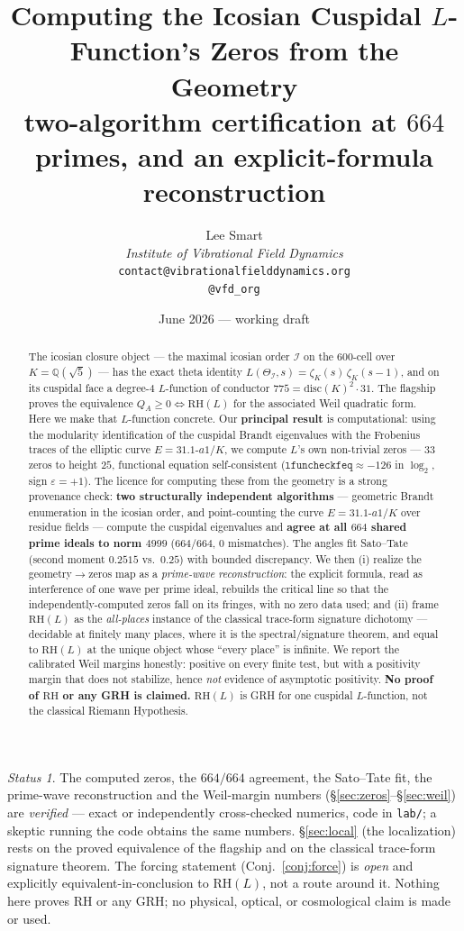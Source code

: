\documentclass[11pt]{article}
\title{Computing the Icosian Cuspidal $L$-Function's Zeros from the Geometry\\
\large two-algorithm certification at $664$ primes, and an explicit-formula reconstruction}
\author{%
  Lee Smart\\[4pt]
  \textit{Institute of Vibrational Field Dynamics}\\[2pt]
  \texttt{contact@vibrationalfielddynamics.org}\\[2pt]
  \texttt{@vfd\_org}%
}
\date{June 2026 --- working draft}
\theoremstyle{remark}
\newtheorem{status}[theorem]{Status}
\newcommand{\II}{\mathcal{I}}
\newcommand{\KK}{K}
\newcommand{\RH}{\mathrm{RH}}
\begin{document}
\maketitle

\begin{abstract}\noindent
The icosian closure object --- the maximal icosian order $\II$ on the $600$-cell over
$\KK=\mathbb{Q}(\sqrt5)$ --- has the exact theta identity
$L(\Theta_\II,s)=\zeta_\KK(s)\,\zeta_\KK(s-1)$, and on its cuspidal face a degree-$4$
$L$-function of conductor $775=\mathrm{disc}(\KK)^2\!\cdot31$. The flagship \cite{Flagship}
proves the equivalence $Q_A\ge0\iff\RH(L)$ for the associated Weil quadratic form. Here we
make that $L$-function concrete. Our \textbf{principal result} is computational: using the
modularity identification of the cuspidal Brandt eigenvalues with the Frobenius traces of
the elliptic curve $E=31.1\text{-}a1/\KK$, we compute $L$'s own non-trivial zeros --- $33$
zeros to height $25$, functional equation self-consistent ($\texttt{lfuncheckfeq}\approx-126$
in $\log_2$, sign $\varepsilon=+1$). The licence for computing these from the geometry is a
strong provenance check: \textbf{two structurally independent algorithms} --- geometric
Brandt enumeration in the icosian order, and point-counting the curve $E=31.1\text{-}a1/\KK$
over residue fields --- compute the cuspidal eigenvalues and \textbf{agree at all $664$
shared prime ideals to norm $4999$} ($664/664$, $0$ mismatches). The angles fit Sato--Tate
(second moment $0.2515$ vs.\ $0.25$) with bounded discrepancy. We then (i) realize the
geometry$\to$zeros map as a \emph{prime-wave reconstruction}: the explicit formula, read as
interference of one wave per prime ideal, rebuilds the critical line so that the
independently-computed zeros fall on its fringes, with no zero data used; and (ii) frame
$\RH(L)$ as the \emph{all-places} instance of the classical trace-form signature
dichotomy --- decidable at finitely many places, where it is the spectral/signature
theorem, and equal to $\RH(L)$ at the unique object whose ``every place'' is infinite. We
report the calibrated Weil margins honestly: positive on every finite test, but with a
positivity margin that does not stabilize, hence \emph{not} evidence of asymptotic
positivity. \textbf{No proof of $\RH$ or any GRH is claimed.} $\RH(L)$ is GRH for one
cuspidal $L$-function, not the classical Riemann Hypothesis.
\end{abstract}

\begin{status}
The computed zeros, the $664/664$ agreement, the Sato--Tate fit, the prime-wave
reconstruction and the Weil-margin numbers (\S\ref{sec:zeros}--\S\ref{sec:weil}) are
\emph{verified} --- exact or independently cross-checked numerics, code in \texttt{lab/};
a skeptic running the code obtains the same numbers. \S\ref{sec:local} (the localization)
rests on the proved equivalence of the flagship \cite{Flagship} and on the classical
trace-form signature theorem. The forcing statement (Conj.~\ref{conj:force}) is
\emph{open} and explicitly equivalent-in-conclusion to $\RH(L)$, not a route around it.
Nothing here proves $\RH$ or any GRH; no physical, optical, or cosmological claim is made
or used.
\end{status}
\end{document}
